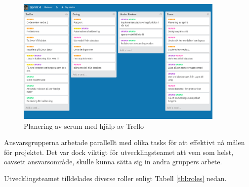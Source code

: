 \documentclass[a4paper,12pt,oneside,final]{extbook}
\begin{document}
\begin{figure}[htb]
  \centering
  \includegraphics[width=0.9\textwidth]{bilder/trello.png}
  \caption{Planering av scrum med hjälp av Trello}
  \label{fig:trello}
\end{figure}

Ansvarsgrupperna arbetade parallellt med olika tasks för att effektivt nå målen för projektet. Det var dock viktigt för utvecklingsteamet att vem som helst, oavsett ansvarsområde, skulle kunna sätta sig in andra gruppers arbete.

Utvecklingsteamet tilldelades diverse roller enligt Tabell \ref{tbl:roles} nedan.
\end{document}

